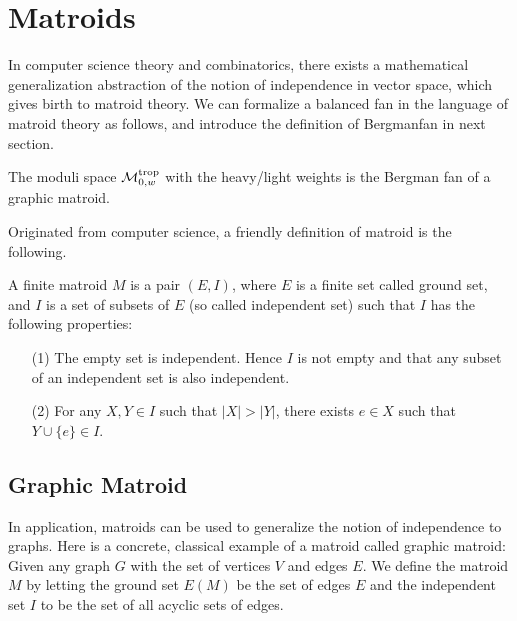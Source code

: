 \section{Matroids}
\label{sec:matroids}
    In computer science theory and combinatorics, 
    there exists a mathematical generalization abstraction of the notion of independence 
    in vector space, which gives birth to matroid theory. 
    We can formalize a balanced fan in the language of matroid theory as follows, and introduce the definition of Bergmanfan in next section.
    \begin{theorem}
    	The moduli space $\mathcal{M}_{0, w}^{\operatorname{trop}}$ with the heavy/light weights is the 
	    Bergman fan of a graphic matroid. 
    \end{theorem}
    
    Originated from computer science, a friendly definition of matroid is the following.
    \begin{definition}
        A finite matroid $M$ is a pair $(E, I)$, 
        where $E$ is a finite set called ground set,
        and $I$ is a set of subsets of $E$ (so called independent set)
        such that $I$ has the following properties:
    	\begin{enumerate}
		    \item[(1)]
			    The empty set is independent. Hence $I$ is not empty
		        and that any subset of an independent set is also independent. 
		        
		    \item[(2)]
			    For any $X, Y \in I$ such that $|X| > |Y|$,
			    there exists $e \in X$ such that $Y \cup \{e\} \in I$. 
	    \end{enumerate}
    \end{definition}
    
    \subsection{Graphic Matroid}
    \label{subsec:graphic-matroid}
        In application, matroids can be used to generalize the notion of independence to graphs.
        Here is a concrete, classical example of a matroid called graphic matroid:
        Given any graph $G$ with the set of vertices $V$ and edges $E$.
        We define the matroid $M$ by letting the ground set $E(M)$ be the set of edges $E$
        and the independent set $I$ to be the set of all acyclic sets of edges. 
        
